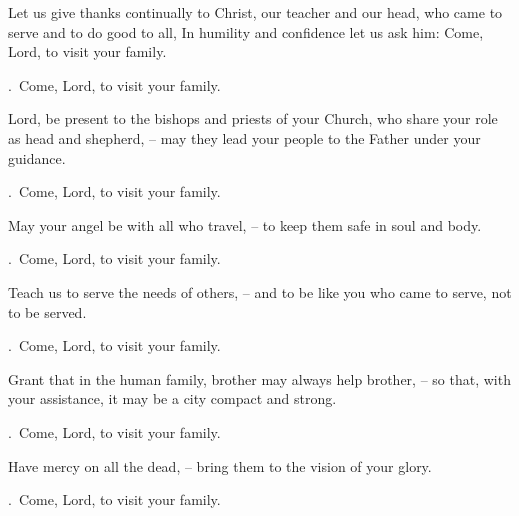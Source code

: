 \lettrine[loversize=0.15,lines=2]{L}{}et us give thanks continually to Christ, our teacher and our head, who came to serve and to do good to all, In humility and confidence let us ask him: Come, Lord, to visit your family.
\par \Rbar.~Come, Lord, to visit your family.

Lord, be present to the bishops and priests of your Church, who share your role as head and shepherd,
– may they lead your people to the Father under your guidance.
\par \Rbar.~Come, Lord, to visit your family.

May your angel be with all who travel,
– to keep them safe in soul and body.
\par \Rbar.~Come, Lord, to visit your family.

Teach us to serve the needs of others,
– and to be like you who came to serve, not to be served.
\par \Rbar.~Come, Lord, to visit your family.

Grant that in the human family, brother may always help brother,
– so that, with your assistance, it may be a city compact and strong.
\par \Rbar.~Come, Lord, to visit your family.

Have mercy on all the dead,
– bring them to the vision of your glory.
\par \Rbar.~Come, Lord, to visit your family.
